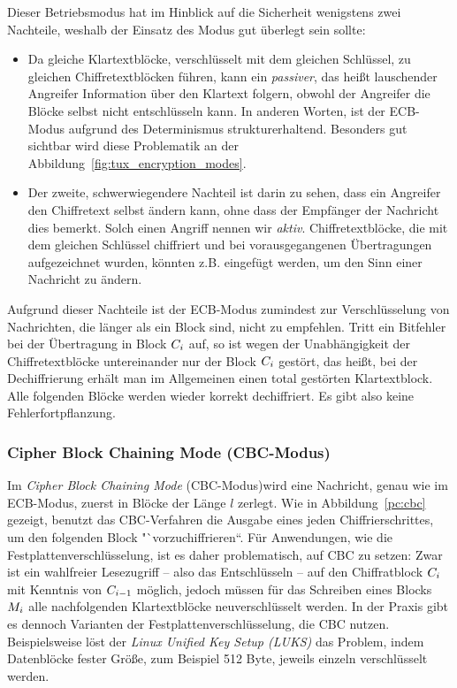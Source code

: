 Dieser Betriebsmodus hat im Hinblick auf die Sicherheit wenigstens zwei Nachteile, weshalb der Einsatz des Modus gut überlegt sein sollte:
\begin{itemize}
	\item Da gleiche Klartextblöcke, verschlüsselt mit dem gleichen Schlüssel, zu gleichen Chiffretextblöcken führen, kann ein \emph{passiver}\indexPassiveAdv, das heißt lauschender Angreifer
	Information über den Klartext folgern, obwohl der Angreifer die Blöcke selbst nicht entschlüsseln kann. In anderen Worten, ist der ECB-Modus aufgrund des Determinismus strukturerhaltend. Besonders gut sichtbar wird diese Problematik an der Abbildung~\ref{fig:tux_encryption_modes}.
	\item Der zweite, schwerwiegendere Nachteil ist darin zu sehen, dass ein Angreifer den Chiffretext selbst ändern kann, ohne dass der Empfänger der
	Nachricht dies bemerkt. Solch einen Angriff nennen wir \emph{aktiv}\indexActiveAdv. Chiffretextblöcke, die mit dem gleichen Schlüssel chiffriert und bei vorausgegangenen Übertragungen aufgezeichnet wurden, könnten
	z.B. eingefügt werden, um den Sinn einer Nachricht zu ändern.
\end{itemize}

Aufgrund dieser Nachteile ist der ECB-Modus zumindest zur Verschlüsselung von Nachrichten, die länger als ein Block sind, nicht zu empfehlen.
Tritt ein Bitfehler bei der Übertragung in Block $C_i$ auf, so ist wegen der Unabhängigkeit der Chiffretextblöcke untereinander nur der Block
$C_i$ gestört, das heißt, bei der Dechiffrierung erhält man im Allgemeinen einen total gestörten Klartextblock. Alle folgenden Blöcke werden wieder korrekt dechiffriert. Es gibt also keine Fehlerfortpflanzung.

\subsubsection{Cipher Block Chaining Mode (CBC-Modus)}\label{ssec:cbc}
Im \emph{Cipher Block Chaining Mode} (CBC-Modus)\indexCBC wird eine Nachricht, genau wie im ECB-Modus, zuerst in Blöcke der Länge $l$ zerlegt. Wie in Abbildung~\ref{pc:cbc} gezeigt, benutzt das CBC-Verfahren die Ausgabe eines jeden Chiffrierschrittes, um den folgenden Block "`vorzuchiffrieren``.
Für Anwendungen, wie die Festplattenverschlüsselung, ist es daher problematisch, auf CBC zu setzen: Zwar ist ein wahlfreier Lesezugriff -- also das Entschlüsseln -- auf den Chiffratblock $C_i$ mit Kenntnis von $C_{i-1}$ möglich, jedoch müssen für das Schreiben eines Blocks $M_i$ alle nachfolgenden Klartextblöcke neuverschlüsselt werden. In der Praxis gibt es dennoch Varianten der Festplattenverschlüsselung, die CBC nutzen.
Beispielsweise löst der \emph{Linux Unified Key Setup (LUKS)} das Problem, indem Datenblöcke fester Größe, zum Beispiel 512 Byte, jeweils einzeln verschlüsselt werden.

